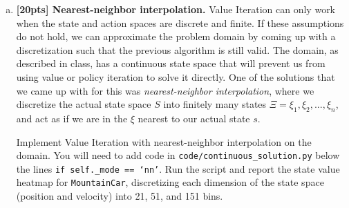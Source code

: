 \documentclass{article}
\begin{document}
\begin{enumerate}[(a)]

\item {\bf [20pts] Nearest-neighbor interpolation.} Value Iteration can only work when the state and action spaces are discrete and finite. If these assumptions do not hold, we can approximate the problem domain by coming up with a discretization such that the previous algorithm is still valid. The  domain, as described in class, has a continuous state space that will prevent us from using value or policy iteration to solve it directly. One of the solutions that we came up with for this was \emph{nearest-neighbor interpolation}, where we discretize the actual state space $S$ into finitely many states $\Xi={\xi_1, \xi_2,...,\xi_n}$, and act as if we are in the $\xi$ nearest to our actual state $s$.

Implement Value Iteration with nearest-neighbor interpolation on the  domain. You will need to add code in \texttt{code/continuous\_solution.py} below the lines \texttt{if self.\_mode == `nn'}. Run the script and report the state value heatmap for \texttt{MountainCar}, discretizing each dimension of the state space (position and velocity) into 21, 51, and 151 bins.


\end{enumerate}
\end{document}
